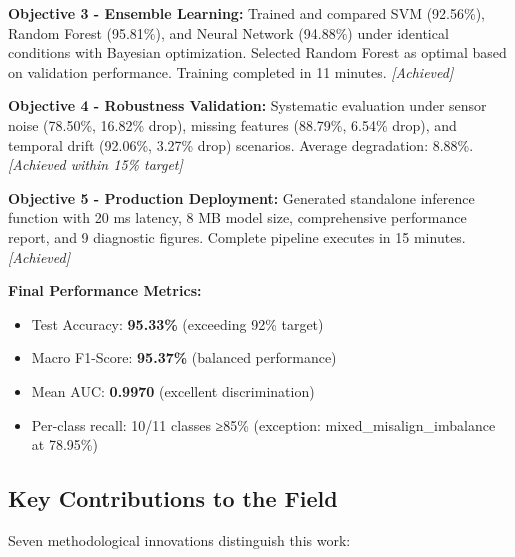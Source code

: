 \documentclass[11pt,a4paper]{article}
\begin{document}
\textbf{Objective 3 - Ensemble Learning:} Trained and compared SVM (92.56\%), Random Forest (95.81\%), and Neural Network (94.88\%) under identical conditions with Bayesian optimization. Selected Random Forest as optimal based on validation performance. Training completed in 11 minutes. \textit{[Achieved]}

\textbf{Objective 4 - Robustness Validation:} Systematic evaluation under sensor noise (78.50\%, 16.82\% drop), missing features (88.79\%, 6.54\% drop), and temporal drift (92.06\%, 3.27\% drop) scenarios. Average degradation: 8.88\%. \textit{[Achieved within 15\% target]}

\textbf{Objective 5 - Production Deployment:} Generated standalone inference function with 20 ms latency, 8 MB model size, comprehensive performance report, and 9 diagnostic figures. Complete pipeline executes in 15 minutes. \textit{[Achieved]}

\textbf{Final Performance Metrics:}
\begin{itemize}[itemsep=0.2em]
    \item Test Accuracy: \textbf{95.33\%} (exceeding 92\% target)
    \item Macro F1-Score: \textbf{95.37\%} (balanced performance)
    \item Mean AUC: \textbf{0.9970} (excellent discrimination)
    \item Per-class recall: 10/11 classes ≥85\% (exception: mixed\_misalign\_imbalance at 78.95\%)
\end{itemize}

\subsection{Key Contributions to the Field}

Seven methodological innovations distinguish this work:
\end{document}
